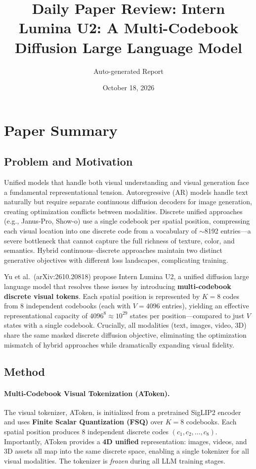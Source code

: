 \documentclass[11pt,a4paper]{article}
\title{Daily Paper Review: Intern Lumina U2: A Multi-Codebook Diffusion Large Language Model}
\author{Auto-generated Report}
\date{October 18, 2026}
\begin{document}
\maketitle

\section{Paper Summary}

\subsection{Problem and Motivation}
Unified models that handle both visual understanding and visual generation face a fundamental representational tension. Autoregressive (AR) models handle text naturally but require separate continuous diffusion decoders for image generation, creating optimization conflicts between modalities. Discrete unified approaches (e.g., Janus-Pro, Show-o) use a single codebook per spatial position, compressing each visual location into one discrete code from a vocabulary of $\sim$8192 entries---a severe bottleneck that cannot capture the full richness of texture, color, and semantics. Hybrid continuous--discrete approaches maintain two distinct generative objectives with different loss landscapes, complicating training.

Yu et al.\ (arXiv:2610.20818) propose Intern Lumina U2, a unified diffusion large language model that resolves these issues by introducing \textbf{multi-codebook discrete visual tokens}. Each spatial position is represented by $K{=}8$ codes from 8 independent codebooks (each with $V{=}4096$ entries), yielding an effective representational capacity of $4096^8 \approx 10^{29}$ states per position---compared to just $V$ states with a single codebook. Crucially, all modalities (text, images, video, 3D) share the same masked discrete diffusion objective, eliminating the optimization mismatch of hybrid approaches while dramatically expanding visual fidelity.

\subsection{Method}

\paragraph{Multi-Codebook Visual Tokenization (AToken).}
The visual tokenizer, AToken, is initialized from a pretrained SigLIP2 encoder and uses \textbf{Finite Scalar Quantization (FSQ)} over $K{=}8$ codebooks. Each spatial position produces 8 independent discrete codes $(c_1, c_2, \ldots, c_8)$. Importantly, AToken provides a \textbf{4D unified} representation: images, videos, and 3D assets all map into the same discrete space, enabling a single tokenizer for all visual modalities. The tokenizer is \emph{frozen} during all LLM training stages.
\end{document}

